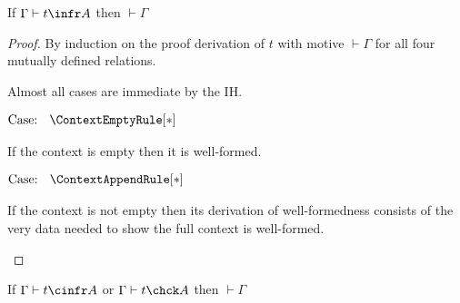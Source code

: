
\begin{theorem}
    If $\Gamma \vdash t \infr A$ then $\vdash \Gamma$
\end{theorem}
\begin{proof}
    By induction on the proof derivation of $t$ with motive $\vdash \Gamma$ for all four mutually defined relations.

    Almost all cases are immediate by the IH.

$\text{Case: }\begin{array}{c} \ContextEmptyRule[*] \end{array}$
\begin{proofcase}
    If the context is empty then it is well-formed.
\end{proofcase}

$\text{Case: }\begin{array}{c} \ContextAppendRule[*] \end{array}$
\begin{proofcase}
    If the context is not empty then its derivation of well-formedness consists of the very data needed to show the full context is well-formed.
\end{proofcase}
\end{proof}

\begin{corollary}
    If $\Gamma \vdash t \cinfr A$ or $\Gamma \vdash t \chck A$ then $\vdash \Gamma$
\end{corollary}